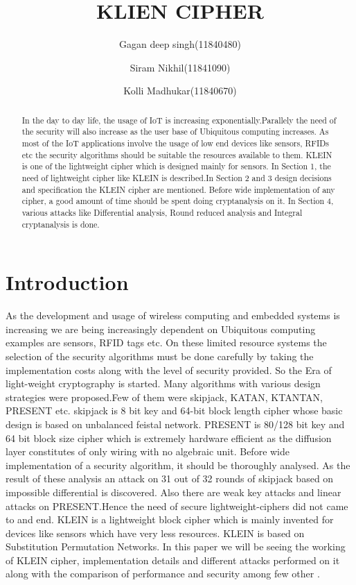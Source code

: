 \documentclass[preprint]{transcrypto}
\author{Gagan deep singh(11840480)\inst{1} \and Siram Nikhil\inst{1}(11841090) \and Kolli Madhukar(11840670)\inst{1}}
\institute{
 Indian Institute of Technology, Bhilai, India 
}
\title{KLIEN CIPHER}
\begin{document}
\maketitle


\begin{abstract}
In the day to day life, the usage of IoT is increasing exponentially.Parallely the need of the security will also increase as the user base of Ubiquitous computing increases. As most of the IoT applications involve the usage of low end devices like sensors, RFIDs etc the security algorithms should be suitable the resources available to them. KLEIN is one of the lightweight cipher which is designed mainly for sensors. In Section 1, the need of lightweight cipher like KLEIN is described.In Section 2 and 3 design decisions and specification the KLEIN cipher are mentioned. Before wide implementation of any cipher, a good amount of time should be spent doing cryptanalysis on it. In Section 4, various attacks like Differential analysis, Round reduced analysis and Integral cryptanalysis is done.
\end{abstract}


\section{Introduction}  \cite{KLEIN}
As the development and usage of wireless computing and embedded systems is increasing we are being increasingly dependent on Ubiquitous computing examples are sensors, RFID tags etc. On these limited resource systems the selection of the security algorithms must be done carefully by taking the implementation costs along with the level of security provided. So the Era of light-weight cryptography is started. Many algorithms with various design strategies were proposed.Few of them were skipjack, KATAN\cite{KATAN}, KTANTAN\cite{KATAN}, PRESENT\cite{PRESENT} etc. skipjack is 8 bit key and 64-bit block length cipher whose basic design is based on unbalanced feistal network. PRESENT is 80/128 bit key and 64 bit block size cipher  which is extremely hardware efficient as the diffusion layer constitutes of only wiring with no algebraic unit.
Before wide implementation of a security algorithm, it should be thoroughly analysed. As the result of these analysis an attack on 31 out of 32 rounds of skipjack based on impossible differential is discovered. Also there are weak key attacks and linear attacks on PRESENT.Hence the need of secure lightweight-ciphers did not came to and end. KLEIN is a lightweight block cipher which is mainly invented for devices like sensors which have very less resources. KLEIN \cite{KLEIN} is based on Substitution Permutation Networks. In this paper we will be seeing the working of KLEIN cipher, implementation details and different attacks performed on it along with the comparison of performance and security among few other .
\end{document}
